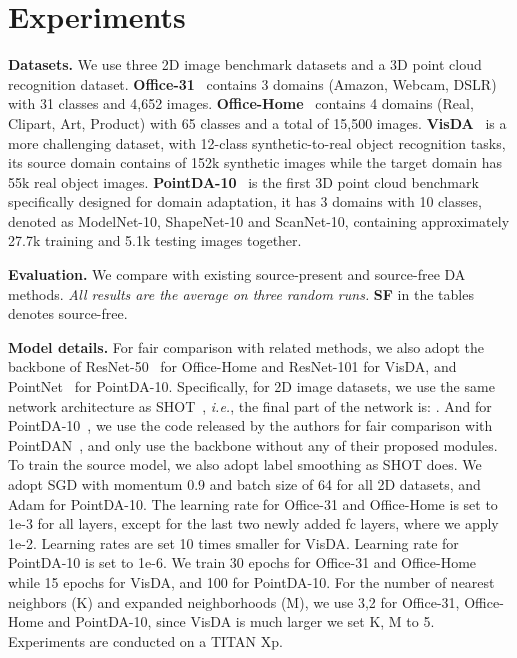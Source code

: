 \documentclass{article}
\begin{document}
\section{Experiments}\label{sec:exp}
\noindent \textbf{Datasets.} We use three 2D image benchmark datasets and a 3D point cloud recognition dataset. \textbf{Office-31}~\cite{saenko2010adapting} contains 3 domains (Amazon, Webcam, DSLR) with 31 classes and 4,652 images. \textbf{Office-Home}~\cite{venkateswara2017deep} contains 4 domains (Real, Clipart, Art, Product) with 65 classes and a total of 15,500 images. \textbf{VisDA}~\cite{peng2017visda} is a more challenging dataset, with 12-class synthetic-to-real object recognition tasks, its source domain contains of 152k synthetic images while the target domain has 55k real object images. \textbf{PointDA-10}~\cite{qin2019pointdan} is the first 3D point cloud benchmark specifically designed for domain adaptation, it has 3 domains with 10 classes, denoted as ModelNet-10, ShapeNet-10 and ScanNet-10, containing approximately 27.7k training and 5.1k testing images together.

\noindent \textbf{Evaluation.} We compare with existing source-present and source-free DA methods. \textit{All results are the average on three random runs.} \textbf{SF} in the tables denotes source-free.

\noindent \textbf{Model details.} For fair comparison with related methods, we also adopt the backbone of ResNet-50~\cite{he2016deep} for Office-Home and  ResNet-101 for VisDA, and PointNet~\cite{qi2017pointnet} for PointDA-10. Specifically, for 2D image datasets, we use the same network architecture as SHOT~\cite{liang2020we}, \textit{i.e.}, the final part of the network is: .
And for PointDA-10~\cite{qi2017pointnet}, we use the code released by the authors for fair comparison with PointDAN~\cite{qi2017pointnet}, and only use the backbone without any of their proposed modules. To train the source model, we also adopt label smoothing as SHOT does. We adopt SGD with momentum 0.9 and batch size of 64 for all 2D datasets, and Adam for PointDA-10. The learning rate for Office-31 and Office-Home is set to 1e-3 for all layers, except for the last two newly added fc layers, where we apply 1e-2. Learning rates are set 10 times smaller for VisDA. Learning rate for PointDA-10 is set to 1e-6. We train 30 epochs for Office-31 and Office-Home while 15 epochs for VisDA, and 100 for PointDA-10. For the number of nearest neighbors (K) and expanded neighborhoods (M), we use 3,2 for Office-31, Office-Home and PointDA-10, since VisDA is much larger we set K, M to 5. Experiments are conducted on a TITAN Xp. 
\end{document}
